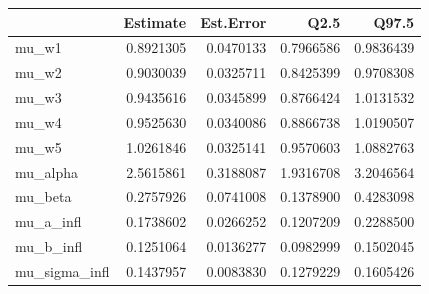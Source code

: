 
\begin{tabular}{lrrrr}
\toprule
  & Estimate & Est.Error & Q2.5 & Q97.5\\
\midrule
mu\_w1 & 0.8921305 & 0.0470133 & 0.7966586 & 0.9836439\\
mu\_w2 & 0.9030039 & 0.0325711 & 0.8425399 & 0.9708308\\
mu\_w3 & 0.9435616 & 0.0345899 & 0.8766424 & 1.0131532\\
mu\_w4 & 0.9525630 & 0.0340086 & 0.8866738 & 1.0190507\\
mu\_w5 & 1.0261846 & 0.0325141 & 0.9570603 & 1.0882763\\
\addlinespace
mu\_alpha & 2.5615861 & 0.3188087 & 1.9316708 & 3.2046564\\
mu\_beta & 0.2757926 & 0.0741008 & 0.1378900 & 0.4283098\\
mu\_a\_infl & 0.1738602 & 0.0266252 & 0.1207209 & 0.2288500\\
mu\_b\_infl & 0.1251064 & 0.0136277 & 0.0982999 & 0.1502045\\
mu\_sigma\_infl & 0.1437957 & 0.0083830 & 0.1279229 & 0.1605426\\
\bottomrule
\end{tabular}
